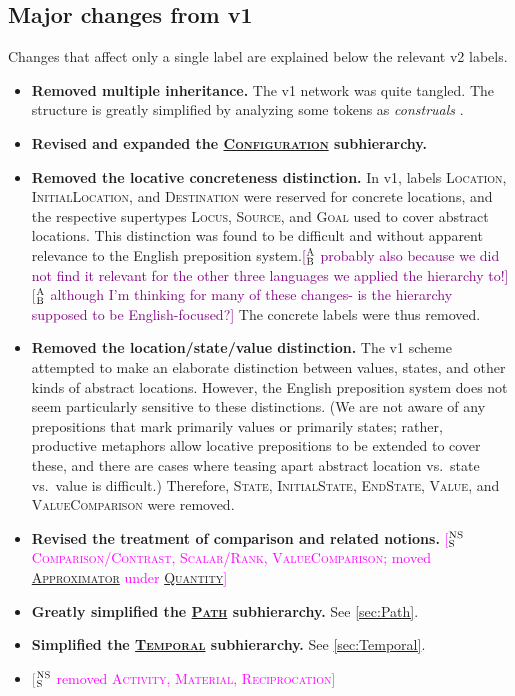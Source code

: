 \documentclass[11pt,letterpaper]{article}
\newcommand{\ensuretext}[1]{#1}
\newcommand{\nssmarker}{\ensuretext{\textcolor{magenta}{\ensuremath{^{\textsc{NS}}_{\textsc{S}}}}}}
\newcommand{\abmarker}{\ensuretext{\textcolor{purple}{\ensuremath{^{\textsc{A}}_{\textsc{B}}}}}}
\newcommand{\arkcomment}[3]{\ensuretext{\textcolor{#3}{[#1 #2]}}}
\newcommand{\nss}[1]{\arkcomment{\nssmarker}{#1}{magenta}}
\newcommand{\ab}[1]{\arkcomment{\abmarker}{#1}{purple}}
\newcommand{\lbl}[1]{\textsc{#1}} %
\newcommand{\sst}[1]{\lbl{#1}} %
\newcommand{\psst}[1]{\textcolor{mdgreen}{\hyperref[sec:#1]{\sst{#1}}}} %
\begin{document}
\subsection{Major changes from v1}

Changes that affect only a single label are explained below the relevant 
v2 labels.

\begin{itemize}
  \item \textbf{Removed multiple inheritance.} 
  The v1 network was quite tangled. The structure is greatly simplified 
  by analyzing some tokens as \emph{construals} \citep{hwang-17}.
  \item \textbf{Revised and expanded the \psst{Configuration} subhierarchy.}
  \item \textbf{Removed the locative concreteness distinction.}
  In v1, labels \sst{Location}, \sst{InitialLocation}, and \sst{Destination} 
  were reserved for concrete locations, and the respective supertypes 
  \sst{Locus}, \sst{Source}, and \sst{Goal} used to cover abstract locations.
  This distinction was found to be difficult and without apparent
  relevance to the English preposition system.\ab{probably also because we did not find it relevant for the other three languages we applied the hierarchy to!}\ab{although I'm thinking for many of these changes- is the hierarchy supposed to be English-focused?} The concrete labels were thus removed.
  \item \textbf{Removed the location/state/value distinction.}
  The v1 scheme attempted to make an elaborate distinction between 
  values, states, and other kinds of abstract locations. 
  However, the English preposition system does not seem particularly 
  sensitive to these distinctions. (We are not aware of any prepositions 
  that mark primarily values or primarily states; rather, productive 
  metaphors allow locative prepositions to be extended to cover these, 
  and there are cases where teasing apart abstract location vs.~state vs.~value 
  is difficult.) Therefore, \sst{State}, \sst{InitialState}, \sst{EndState}, 
  \sst{Value}, and \sst{ValueComparison} were removed.
  \item \textbf{Revised the treatment of comparison and related notions.} 
  \nss{\sst{Comparison/Contrast}, \sst{Scalar/Rank}, \sst{ValueComparison}; 
  moved \psst{Approximator} under \psst{Quantity}}
  \item \textbf{Greatly simplified the \psst{Path} subhierarchy.} See \cref{sec:Path}.
  \item \textbf{Simplified the \psst{Temporal} subhierarchy.} See \cref{sec:Temporal}.
  \item \nss{removed \sst{Activity}, \sst{Material}, \sst{Reciprocation}}
\end{itemize}
\end{document}
